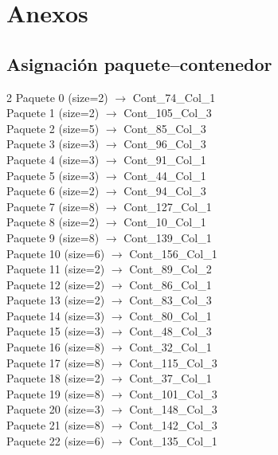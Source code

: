 \section{Anexos}

\subsection*{Asignación paquete–contenedor}
\begin{multicols}{2}
\scriptsize
\noindent
Paquete 0 (size=2) $\rightarrow$ Cont\_74\_Col\_1\\
Paquete 1 (size=2) $\rightarrow$ Cont\_105\_Col\_3\\
Paquete 2 (size=5) $\rightarrow$ Cont\_85\_Col\_3\\
Paquete 3 (size=3) $\rightarrow$ Cont\_96\_Col\_3\\
Paquete 4 (size=3) $\rightarrow$ Cont\_91\_Col\_1\\
Paquete 5 (size=3) $\rightarrow$ Cont\_44\_Col\_1\\
Paquete 6 (size=2) $\rightarrow$ Cont\_94\_Col\_3\\
Paquete 7 (size=8) $\rightarrow$ Cont\_127\_Col\_1\\
Paquete 8 (size=2) $\rightarrow$ Cont\_10\_Col\_1\\
Paquete 9 (size=8) $\rightarrow$ Cont\_139\_Col\_1\\
Paquete 10 (size=6) $\rightarrow$ Cont\_156\_Col\_1\\
Paquete 11 (size=2) $\rightarrow$ Cont\_89\_Col\_2\\
Paquete 12 (size=2) $\rightarrow$ Cont\_86\_Col\_1\\
Paquete 13 (size=2) $\rightarrow$ Cont\_83\_Col\_3\\
Paquete 14 (size=3) $\rightarrow$ Cont\_80\_Col\_1\\
Paquete 15 (size=3) $\rightarrow$ Cont\_48\_Col\_3\\
Paquete 16 (size=8) $\rightarrow$ Cont\_32\_Col\_1\\
Paquete 17 (size=8) $\rightarrow$ Cont\_115\_Col\_3\\
Paquete 18 (size=2) $\rightarrow$ Cont\_37\_Col\_1\\
Paquete 19 (size=8) $\rightarrow$ Cont\_101\_Col\_3\\
Paquete 20 (size=3) $\rightarrow$ Cont\_148\_Col\_3\\
Paquete 21 (size=8) $\rightarrow$ Cont\_142\_Col\_3\\
Paquete 22 (size=6) $\rightarrow$ Cont\_135\_Col\_1\\

\end{multicols}
